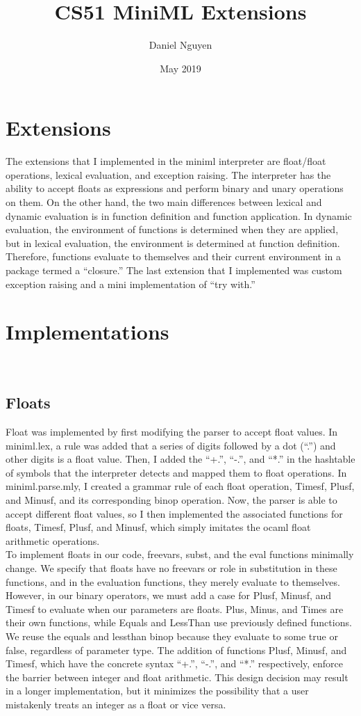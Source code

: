 \documentclass{article}
\title{CS51 MiniML Extensions}
\author{Daniel Nguyen}
\date{May 2019}
\begin{document}
\maketitle

\section{Extensions}
The extensions that I implemented in the miniml interpreter are float/float operations, lexical evaluation, and exception raising. The interpreter has the ability to accept floats as expressions and perform binary and unary operations on them. On the other hand, the two main differences between lexical and dynamic evaluation is in function definition and function application. In dynamic evaluation, the environment of functions is determined when they are applied, but in lexical evaluation, the environment is determined at function definition. Therefore, functions evaluate to themselves and their current environment in a package termed a “closure.” The last extension that I implemented was custom exception raising and a mini implementation of “try with.” 

\section{Implementations}
\\
\subsection{Floats}

Float was implemented by first modifying the parser to accept float values. In miniml.lex, a rule was added that a series of digits followed by a dot (“.”) and other digits is a float value. Then, I added the “+.”, “-.”, and “*.” in the hashtable of symbols that the interpreter detects and mapped them to float operations. In miniml.parse.mly, I created a grammar rule of each float operation, Timesf, Plusf, and Minusf, and its corresponding binop operation. Now, the parser is able to accept different float values, so I then implemented the associated functions for floats, Timesf, Plusf, and Minusf, which simply imitates the ocaml float arithmetic operations. 
\\
To implement floats in our code, freevars, subst, and the eval functions minimally change. We specify that floats have no freevars or role in substitution in these functions, and in the evaluation functions, they merely evaluate to themselves. However, in our binary operators, we must add a case for Plusf, Minusf, and Timesf to evaluate when our parameters are floats. Plus, Minus, and Times are their own functions, while Equals and LessThan use previously defined functions. We reuse the equals and lessthan binop because they evaluate to some true or false, regardless of parameter type. The addition of functions Plusf, Minusf, and Timesf, which have the concrete syntax “+.”, “-.”, and “*.” respectively, enforce the barrier between integer and float arithmetic. This design decision may result  in a longer implementation, but it minimizes the possibility that a user mistakenly treats an integer as a float or vice versa.
\\
\end{document}
